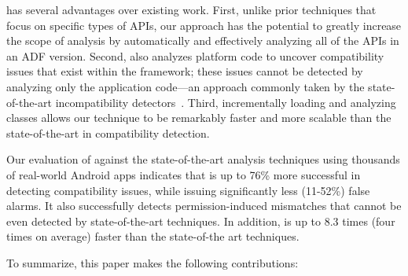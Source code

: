 


\@approach has several advantages over existing
work. First, 
unlike prior techniques that focus on specific types of APIs,
our approach has the potential to greatly increase the
scope of analysis by automatically and effectively
analyzing all of the APIs in an ADF version.
Second, \@approach also analyzes platform code to
uncover compatibility issues that exist within the
framework; these issues cannot be detected by analyzing
only the application code---an approach commonly taken
by the state-of-the-art
incompatibility detectors~\cite{huang2018understanding,lili2018cid,linttips}.
Third, incrementally loading and analyzing classes allows our technique to be remarkably faster and more scalable than the state-of-the-art in compatibility detection.



Our evaluation of \@approach against the state-of-the-art analysis
techniques using thousands of real-world Android apps indicates that 
\@approach is up to 76\% more successful in detecting compatibility issues, while issuing significantly less (11-52\%) false alarms. 
It also successfully detects permission-induced mismatches that cannot be even detected by state-of-the-art techniques.
In addition, \@approach is  up to 8.3 times (four times on average) faster than
the state-of-the art techniques. 


To summarize,
this paper makes the following contributions:
 
